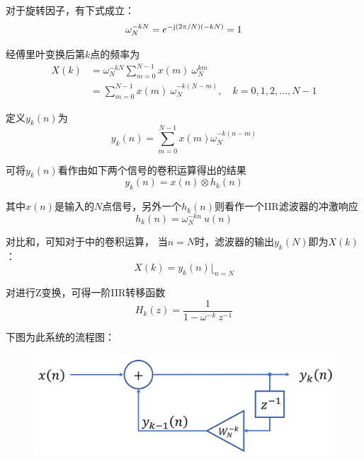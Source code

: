对于旋转因子，有下式成立：
\begin{equation}
  \omega_{N}^{-kN}=e^{-\mathrm{j}(2{\pi /N})(-kN)}=1
\end{equation}

经傅里叶变换后第$k$点的频率为
\begin{equation}\label{eqn:freq_n}
\begin{aligned}
  X(k)&=\omega_{N}^{-kN}\sum_{m=0}^{N-1}x(m) \ \omega_{N}^{km}\\
  &=\sum_{m=0}^{N-1}x(m) \ \omega_{N}^{-k(N-m)},\quad
  k=0,1,2,...,N-1
\end{aligned}
\end{equation}

定义$y_{k}(n)$为
\begin{equation}\label{eqn:y_k}
  y_{k}(n)=\sum _{m=0}^{N-1}x(m)\omega_{N}^{-k(n-m)}
\end{equation}

可将$y_{k}(n)$看作由如下两个信号的卷积运算得出的结果
\begin{equation}\label{eqn:conv}
  y_{k}(n)=x(n)\otimes h_{k}(n)
\end{equation}

其中$x(n)$是输入的$N$点信号，另外一个$h_{k}(n)$则看作一个IIR滤波器的冲激响应
\begin{equation}\label{eqn:pulse}
  h_{k}(n)=\omega_{N}^{-kn}\ u(n)
\end{equation}

对比和，可知对于中的卷积运算，
当$n=N$时，滤波器的输出$y_{k}(N)$即为$X(k)$：
\begin{equation}\label{eqn:output}
  X(k)=y_{k}(n)\lfloor_{n=N}
\end{equation}

对进行Z变换，可得一阶IIR转移函数
\begin{equation}
  H_{k}(z)=\frac{1}{1-{\omega^{-k}\ z^{-1}}}
\end{equation}

下图为此系统的流程图：
\begin{figure}[H]
\center
  \includegraphics[width=\textwidth]{img/goertzel-1st.png}
\end{figure}

